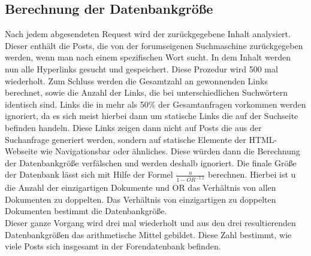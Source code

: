 \subsection{Berechnung der Datenbankgröße}
Nach jedem abgesendeten Request wird der zurückgegebene Inhalt analysiert. Dieser enthält die Posts, die von der 
forumseigenen Suchmaschine zurückgegeben werden, wenn man nach einem spezifischen Wort sucht. In dem Inhalt werden nun alle Hyperlinks gesucht und gespeichert. Diese Prozedur wird 500 mal wiederholt. Zum Schluss werden die Gesamtzahl an gewonnenden Links berechnet, sowie die Anzahl der Links, die bei unterschiedlichen Suchwörtern identisch sind. Links die in mehr als 50\% der Gesamtanfragen vorkommen werden ignoriert, da es sich meist hierbei dann um statische Links die auf der Suchseite befinden handeln. Diese Links zeigen dann nicht auf Posts die aus der Suchanfrage generiert werden, sondern auf statische Elemente der HTML-Webseite wie Navigationsbar oder ähnliches. Diese würden dann die Berechnung der Datenbankgröße verfälschen und werden deshalb ignoriert.
Die finale Größe der Datenbank lässt sich mit Hilfe der Formel \(\frac{u}{1-OR^{-1.1}}\) \cite{lu2008efficient} berechnen. Hierbei ist u die Anzahl der einzigartigen Dokumente und OR das Verhältnis von allen Dokumenten zu doppelten. Das Verhältnis von einzigartigen zu doppelten Dokumenten bestimmt die Datenbankgröße.\\
Dieser ganze Vorgang wird drei mal wiederholt und aus den drei resultierenden Datenbankgrößen das arithmetische Mittel gebildet. Diese Zahl bestimmt, wie viele Posts sich insgesamt in der Forendatenbank befinden.

\newpage
